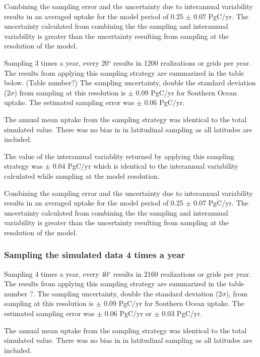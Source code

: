 \documentclass[11pt, a4paper]{article}
\numberwithin{figure}{section}
\numberwithin{table}{section}
\begin{document}
Combining the sampling error and the uncertainty due to interannual
variability results in an averaged uptake for the model period of 
0.25 $\pm$ 0.07 PgC/yr.
The uncertainty calculated from combining the the sampling and 
interannual variability is greater than the uncertainty resulting from
sampling at the resolution of the model.


Sampling 3 times a year, every 20$^{\circ}$ results in 1200 realizations 
or grids per year. The results from applying this sampling strategy are
summarized in the table below. (Table number?)
The sampling uncertainty, double the standard deviation (2$\sigma$) 
from sampling at this resolution is
$\pm$ 0.09 PgC/yr for Southern Ocean uptake.
The estimated sampling error was 
$\pm$ 0.06 PgC/yr. %

The annual mean uptake from the sampling strategy was identical to 
the total simulated value. There was no bias in in latitudinal sampling
as all latitudes are included.

The value of the interannual variablity returned by applying this
sampling strategy was $\pm$ 0.04 PgC/yr which is identical to the 
interannual variability calculated while sampling at the model 
resolution. 

Combining the sampling error and the uncertainty due to interannual
variability results in an averaged uptake for the model period of 
0.25 $\pm$ 0.07 PgC/yr.
The uncertainty calculated from combining the the sampling and 
interannual variability is greater than the uncertainty resulting from
sampling at the resolution of the model.

\subsubsection{Sampling the simulated data 4 times a year}

Sampling 4 times a year, every 40$^{\circ}$ results in 2160 realizations 
or grids per year. The results from applying this sampling strategy are
summarized in the table number ?.
The sampling uncertainty, double the standard deviation (2$\sigma$), 
from sampling at this resolution is
$\pm$ 0.09 PgC/yr for Southern Ocean uptake.
The estimated sampling error was 
$\pm$ 0.06 PgC/yr or $\pm$ 0.03 PgC/yr.

The annual mean uptake from the sampling strategy was identical to 
the total simulated value. There was no bias in in latitudinal sampling
as all latitudes are included.
\end{document}
